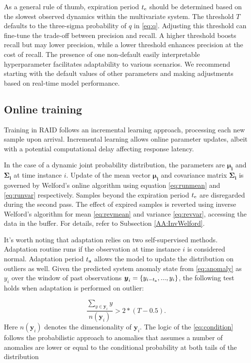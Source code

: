 As a general rule of thumb, expiration period $t _{\text{e}}$ should be determined based on the slowest observed dynamics within the multivariate system. The threshold $T$ defaults to the three-sigma probability of $q$ in \eqref{eq:q}. Adjusting this threshold can fine-tune the trade-off between precision and recall. A higher threshold boosts recall but may lower precision, while a lower threshold enhances precision at the cost of recall. The presence of one non-default easily interpretable hyperparameter facilitates adaptability to various scenarios. We recommend starting with the default values of other parameters and making adjustments based on real-time model performance.

\subsection{Online training}\label{train}
Training in RAID follows an incremental learning approach, processing each new sample upon arrival. Incremental learning allows online parameter updates, albeit with a potential computational delay affecting response latency.

In the case of a dynamic joint probability distribution, the parameters are $\boldsymbol{\mu_i}$ and $\boldsymbol{\Sigma_i}$ at time instance \(i\). Update of the mean vector $\boldsymbol{\mu_i}$ and covariance matrix $\boldsymbol{\Sigma_i}$ is governed by Welford's online algorithm using equation \eqref{eq:runmean} and \eqref{eq:runvar} respectively. Samples beyond the expiration period $t _{\text{e}}$ are disregarded during the second pass. The effect of expired samples is reverted using inverse Welford's algorithm for mean \eqref{eq:revmean} and variance \eqref{eq:revvar}, accessing the data in the buffer. For details, refer to Subsection \ref{AA:InvWelford}.

It's worth noting that adaptation relies on two self-supervised methods. Adaptation routine runs if the observation at time instance \(i\) is considered normal. Adaptation period $t _{\text{a}}$ allows the model to update the distribution on outliers as well. Given the predicted system anomaly state from \eqref{eq:anomaly} as $y_i$ over the window of past observations \(\boldsymbol{y}_i=\{y_{i-t _{\text{a}}},...,y_{i}\}\), the following test holds when adaptation is performed on outlier:

\begin{equation}
  {\frac{\sum_{y\in \boldsymbol{y}_i}y}{n(\boldsymbol{y}_i)}} > 2*(T-0.5)\text{.}\label{eq:condition}
\end{equation}
Here \(n(\boldsymbol{y}_i)\) denotes the dimensionality of \(\boldsymbol{y}_i\). The logic of the \eqref{eq:condition} follows the probabilistic approach to anomalies that assumes a number of anomalies are lower or equal to the conditional probability at both tails of the distribution

